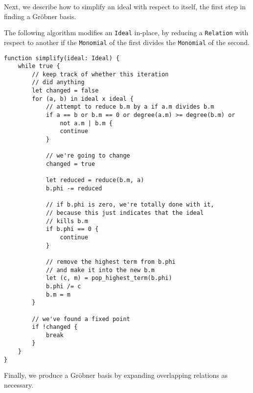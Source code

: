 Next, we describe how to simplify an ideal with respect to itself, the first
step in finding a Gr\"obner basis.

\begin{subalg}
    The following algorithm modifies an \verb|Ideal| in-place, by reducing a \verb|Relation|
    with respect to another if the \verb|Monomial| of the first divides the \verb|Monomial|
    of the second.
\begin{verbatim}
function simplify(ideal: Ideal) {
    while true {
        // keep track of whether this iteration 
        // did anything
        let changed = false
        for (a, b) in ideal x ideal {
            // attempt to reduce b.m by a if a.m divides b.m
            if a == b or b.m == 0 or degree(a.m) >= degree(b.m) or 
                not a.m | b.m {
                continue
            }
            
            // we're going to change
            changed = true
            
            let reduced = reduce(b.m, a)
            b.phi -= reduced
            
            // if b.phi is zero, we're totally done with it,
            // because this just indicates that the ideal
            // kills b.m
            if b.phi == 0 {
                continue
            }
            
            // remove the highest term from b.phi
            // and make it into the new b.m
            let (c, m) = pop_highest_term(b.phi)
            b.phi /= c
            b.m = m
        }
        
        // we've found a fixed point
        if !changed {
            break
        }
    }
}
\end{verbatim}
\end{subalg}

Finally, we produce a Gr\"obner basis by expanding overlapping relations as
necessary.

